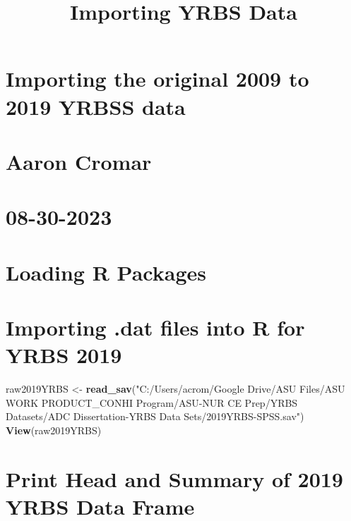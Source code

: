 \documentclass[
]{article}
\title{Importing YRBS Data}
\author{}
\date{\vspace{-2.5em}}
\newenvironment{Shaded}{\begin{snugshade}}{\end{snugshade}}
\newcommand{\FunctionTok}[1]{\textcolor[rgb]{0.13,0.29,0.53}{\textbf{#1}}}
\newcommand{\NormalTok}[1]{#1}
\newcommand{\OtherTok}[1]{\textcolor[rgb]{0.56,0.35,0.01}{#1}}
\newcommand{\StringTok}[1]{\textcolor[rgb]{0.31,0.60,0.02}{#1}}
\begin{document}
\maketitle

\hypertarget{importing-the-original-2009-to-2019-yrbss-data}{%
\section{Importing the original 2009 to 2019 YRBSS
data}\label{importing-the-original-2009-to-2019-yrbss-data}}

\hypertarget{aaron-cromar}{%
\section{Aaron Cromar}\label{aaron-cromar}}

\hypertarget{section}{%
\section{08-30-2023}\label{section}}

\hypertarget{loading-r-packages}{%
\section{Loading R Packages}\label{loading-r-packages}}

\hypertarget{importing-.dat-files-into-r-for-yrbs-2019}{%
\section{Importing .dat files into R for YRBS
2019}\label{importing-.dat-files-into-r-for-yrbs-2019}}

\begin{Shaded}
\begin{Highlighting}[]
\NormalTok{raw2019YRBS }\OtherTok{\textless{}{-}} \FunctionTok{read\_sav}\NormalTok{(}\StringTok{"C:/Users/acrom/Google Drive/ASU Files/ASU WORK PRODUCT\_CONHI Program/ASU{-}NUR CE Prep/YRBS Datasets/ADC Dissertation{-}YRBS Data Sets/2019YRBS{-}SPSS.sav"}\NormalTok{)}
\FunctionTok{View}\NormalTok{(raw2019YRBS)}
\end{Highlighting}
\end{Shaded}

\hypertarget{print-head-and-summary-of-2019-yrbs-data-frame}{%
\section{Print Head and Summary of 2019 YRBS Data
Frame}\label{print-head-and-summary-of-2019-yrbs-data-frame}}
\end{document}
